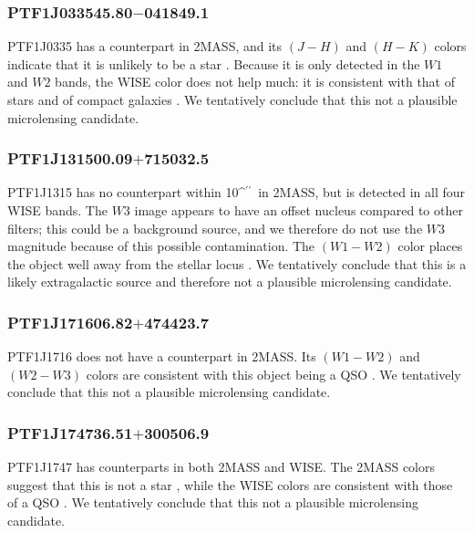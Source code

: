 \documentclass{emulateapj}
\def\asec{\ifmmode^{\prime\prime}\else$^{\prime\prime}$\fi}
\begin{document}
\subsubsection*{PTF1J033545.80$-$041849.1} %
PTF1J0335 has a counterpart in 2MASS, and its $(J-H)$ and $(H-K)$ colors indicate that it is unlikely to be a star \citep{kev07}. Because it is only detected in the $W1$ and $W2$ bands, the WISE color does not help much: it is consistent with that of stars and of compact galaxies \citep[cf.\ Figure 14 in][]{yan2013}. We tentatively conclude that this not a plausible microlensing candidate. 

\subsubsection*{PTF1J131500.09$+$715032.5} %
PTF1J1315 has no counterpart within 10\asec\ in 2MASS, but is detected in all four WISE bands. %
The $W3$ image appears to have an offset nucleus compared to other filters; this could be a background source, and we therefore do not use the $W3$ magnitude because of this possible contamination. The $(W1-W2)$ color places the object well away from the stellar locus \citep[cf.\ Figure 14 in][]{yan2013}. We tentatively conclude that this is a likely extragalactic source and therefore not a plausible microlensing candidate. 

\subsubsection*{PTF1J171606.82$+$474423.7} %
PTF1J1716 does not have a counterpart in 2MASS. Its $(W1-W2)$ and $(W2-W3)$ colors are consistent with this object being a QSO \citep[cf.\ Figure 14 in][]{yan2013}. We tentatively conclude that this not a plausible microlensing candidate.
 
\subsubsection*{PTF1J174736.51$+$300506.9} %
PTF1J1747 has counterparts in both 2MASS and WISE. The 2MASS colors suggest that this is not a star \citep{kev07}, while the WISE colors are consistent with those of a QSO \citep[cf.\ Figure 14 in][]{yan2013}. %
We tentatively conclude that this not a plausible microlensing candidate. 
\end{document}
